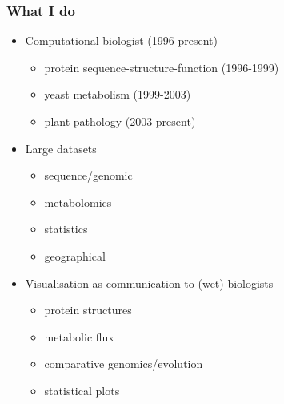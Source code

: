 
\begin{frame}
  \frametitle{What I do}
      \begin{itemize}  
        \item \textcolor{hutton_green}{Computational biologist (1996-present)}
        \begin{itemize}
          \item protein sequence-structure-function (1996-1999)
          \item yeast metabolism (1999-2003)
          \item plant pathology (2003-present)
        \end{itemize}
        \item \textcolor{hutton_blue}{Large datasets}
        \begin{itemize}
          \item sequence/genomic
          \item metabolomics
          \item statistics
          \item geographical
        \end{itemize}
        \item \textcolor{hutton_purple}{Visualisation as communication to (wet) biologists}
        \begin{itemize}
          \item protein structures
          \item metabolic flux
          \item comparative genomics/evolution
          \item statistical plots
        \end{itemize}
      \end{itemize}  
\end{frame}

